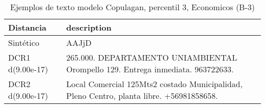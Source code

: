 \begin{table}[H]
\centering
\fontsize{10}{14}\selectfont
\caption{Ejemplos de texto modelo Copulagan, percentil 3, Economicos (B-3)}
\label{table-example-economicos-b-3-copulagan-3p-text}
\begin{tabular}{|l|m{35em}|}
\hline
\rowcolor[gray]{0.8}
Distancia & description \\
\hline Sintético & AAJjD \\
\hline DCR1 d(9.00e-17) & 265.000. DEPARTAMENTO UNIAMBIENTAL Orompello 129. Entrega inmediata. 963722633. \\
\hline DCR2 d(9.00e-17) & Local Comercial 125Mts2 costado Municipalidad, Pleno Centro, planta libre. +56981858658. \\
\hline
\end{tabular}
\end{table}

